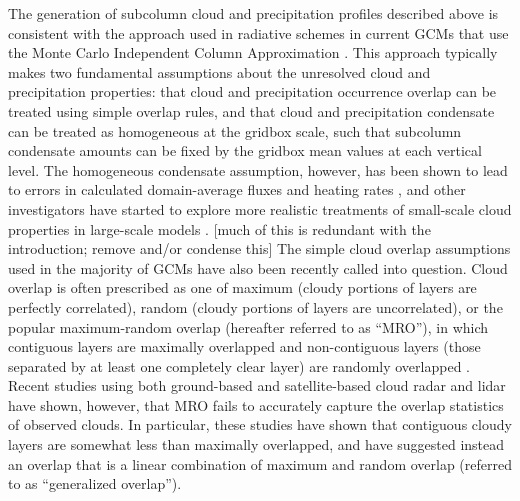 The generation of subcolumn cloud and precipitation profiles described above is consistent with the approach used in radiative schemes in current GCMs that use the Monte Carlo Independent Column Approximation \citep[McICA;][]{pincus_et_al_2003}. This approach typically makes two fundamental assumptions about the unresolved cloud and precipitation properties: that cloud and precipitation occurrence overlap can be treated using simple overlap rules, and that cloud and precipitation condensate can be treated as homogeneous at the gridbox scale, such that subcolumn condensate amounts can be fixed by the gridbox mean values at each vertical level. The homogeneous condensate assumption, however, has been shown to lead to errors in calculated domain-average fluxes and heating rates \citep[e.g.,][]{barker_et_al_1999}, and other investigators have started to explore more realistic treatments of small-scale cloud properties in large-scale models \citep[e.g.,][]{oreopoulos_et_al_2012, von_salzen_et_al_2012}. [much of this is redundant with the introduction; remove and/or condense this] The simple cloud overlap assumptions used in the majority of GCMs have also been recently called into question. Cloud overlap is often prescribed as one of maximum (cloudy portions of layers are perfectly correlated), random (cloudy portions of layers are uncorrelated), or the popular maximum-random overlap (hereafter referred to as ``MRO''), in which contiguous layers are maximally overlapped and non-contiguous layers (those separated by at least one completely clear layer) are randomly overlapped \citep[e.g.,][]{geleyn_and_hollingsworth_1979}. Recent studies using both ground-based \citep{mace_and_benson-troth_2002, hogan_and_illingworth_2000} and satellite-based \citep{barker_2008} cloud radar and lidar have shown, however, that MRO fails to accurately capture the overlap statistics of observed clouds.  In particular, these studies have shown that contiguous cloudy layers are somewhat less than maximally overlapped, and have suggested instead an overlap that is a linear combination of maximum and random overlap (referred to as ``generalized overlap'').

